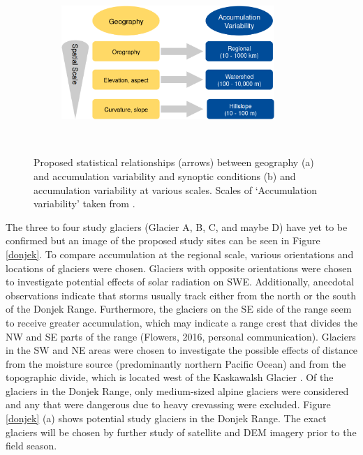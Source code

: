 \documentclass[12pt]{article}
\begin{document}
\begin{figure}[t!]
    \begin{subfigure}[t]{0.5\textwidth}
        \includegraphics[height=1.7in]{flow_geography.png}
        \caption{}
        \label{flow_geography}
    \end{subfigure}%
    ~
    \begin{subfigure}[t]{0.5\textwidth}
        \caption{}
        \label{flow_synoptic}
    \end{subfigure}
    \caption{Proposed statistical relationships (arrows) between geography (a) and accumulation variability and synoptic conditions (b) and accumulation variability at various scales. Scales of `Accumulation variability' taken from \cite{Clark2011}.}
\end{figure}

The three to four study glaciers (Glacier A, B, C, and maybe D) have yet to be confirmed but an image of the proposed study sites can be seen in Figure \ref{donjek}. To compare accumulation at the regional scale, various orientations and locations of glaciers were chosen. Glaciers with opposite orientations were chosen to investigate potential effects of solar radiation on SWE. Additionally, anecdotal observations indicate that storms usually track either from the north or the south of the Donjek Range. Furthermore, the glaciers on the SE side of the range seem to receive greater accumulation, which may indicate a range crest that divides the NW and SE parts of the range (Flowers, 2016, personal communication). Glaciers in the SW and NE areas were chosen to investigate the possible effects of distance from the moisture source (predominantly northern Pacific Ocean) and from the topographic divide, which is located west of the Kaskawalsh Glacier \citep{Taylor1969}. Of the glaciers in the Donjek Range, only medium-sized alpine glaciers were considered and any that were dangerous due to heavy crevassing were excluded. Figure \ref{donjek} (a) shows potential study glaciers in the Donjek Range. The exact glaciers will be chosen by further study of satellite and DEM imagery prior to the field season.  
\end{document}
